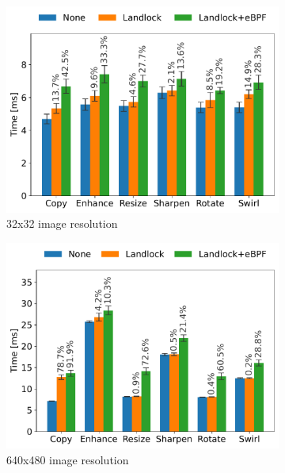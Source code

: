 \begin{figure}[t!]
  \begin{subfigure}[b]{0.5\linewidth}
    \centering
    \includegraphics[width=\linewidth]{chapters/dmng/fig/convert_small.pdf}
    \caption{32x32 image resolution}
    \label{fig:convert-small-times}
  \end{subfigure}
  \begin{subfigure}[b]{0.5\linewidth}
    \centering
    \includegraphics[width=\linewidth]{chapters/dmng/fig/convert_med.pdf}
    \caption{640x480 image resolution}
    \label{fig:convert-med-times}
  \end{subfigure}
  \begin{center}
    \begin{subfigure}[b]{0.5\linewidth}

\end{subfigure}
\end{center}
\end{figure}
